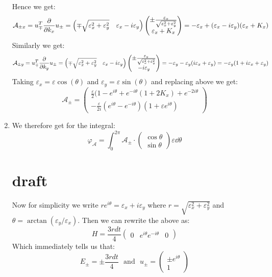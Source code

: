 \documentclass[10pt,a4paper]{article}
\begin{document}
\begin{enumerate}
Hence we get:
\[
\mathcal{A}_{\pm x} = u_\mp^T \pdv{}{k_x} u_\pm = \begin{pmatrix}
\mp \sqrt{\varepsilon_x^2 + \varepsilon_y^2} & \varepsilon_x - i \varepsilon_y 
\end{pmatrix}  \begin{pmatrix}
\pm \frac{\varepsilon_x}{\sqrt{\varepsilon_x^2 + \varepsilon_y^2}}\\
\varepsilon_x + K_x
\end{pmatrix} = - \varepsilon_x + (\varepsilon_x - i \varepsilon_y) (\varepsilon_x + K_x)
\]
Similarly we get:
\[
\mathcal{A}_{\pm y} = u_\mp^T \pdv{}{k_y} u_\pm = \begin{pmatrix}
\mp \sqrt{\varepsilon_x^2 + \varepsilon_y^2} & \varepsilon_x - i \varepsilon_y 
\end{pmatrix}  \begin{pmatrix}
\pm \frac{\varepsilon_y}{\sqrt{\varepsilon_x^2 + \varepsilon_y^2}}\\
- i \varepsilon_y
\end{pmatrix} = - \varepsilon_y - \varepsilon_y (i\varepsilon_x + \varepsilon_y) = -\varepsilon_y(1 + i \varepsilon_x + \varepsilon_y)
\]
Taking $\varepsilon_x = \varepsilon \cos(\theta)$ and $\varepsilon_y = \varepsilon \sin(\theta)$ and replacing above we get:
\[
\mathcal{A}_\pm = \begin{pmatrix}
\frac{\varepsilon}{2}(1 - e^{i\theta} + e^{-i\theta}(1 + 2 K_x) + e^{-2i\theta}\\ 
-\frac{\varepsilon}{2i}(e^{i \theta} - e^{-i\theta})(1 + \varepsilon e^{i \theta}) 
\end{pmatrix}
\]

\item We therefore get for the integral:
\[
\varphi_\mathcal{A} = \int_0^{2\pi} \mathcal{A}_{\pm} \cdot \begin{pmatrix}
\cos\theta\\
\sin\theta
\end{pmatrix} \varepsilon  \dd \theta
\]

\section{draft}
Now for simplicity we write $r e^{i \theta} =  \varepsilon_x + i \varepsilon_y$ where $r  = \sqrt{\varepsilon_x^2 + \varepsilon_y^2}$ and $\theta = \arctan(\varepsilon_y/\varepsilon_x)$. Then we can rewrite the above as:
\[
H = \frac{3 r dt }{4} \begin{pmatrix}
0 & e^{i\theta}
e^{- i \theta} & 0
\end{pmatrix}
\] 
Which immediately tells us that:
\[
E_\pm = \pm \frac{3 r d t}{4} \mbox{~~and~~} u_{\pm} = \begin{pmatrix}
\pm e^{i \theta}\\
1
\end{pmatrix}
\]


\end{enumerate}
\end{document}
